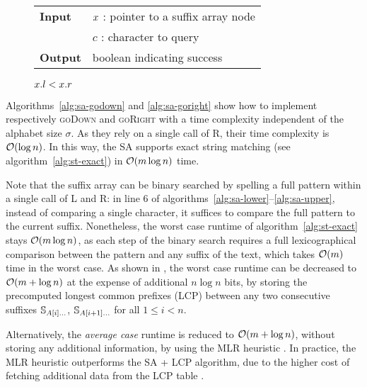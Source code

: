 \begin{figure*}[b!]
\begin{center}
\begin{minipage}[t]{.6\textwidth}
\begin{algorithm}[H]
\begin{tabular}{ll}
\textbf{Input}  & $x$ : pointer to a suffix array node\\
				& $c$ : character to query\\
\textbf{Output} & boolean indicating success\\
\end{tabular}
\begin{algorithmic}[1]
	\State \Return \False
\EndIf
{}
\State \Return $x.l < x.r$
\end{algorithmic}
\label{alg:sa-godownc}
\end{algorithm}
\end{minipage}
\end{center}
\end{figure*}

Algorithms~\ref{alg:sa-godown} and \ref{alg:sa-goright} show how to implement respectively \textsc{goDown} and \textsc{goRight} with a time complexity independent of the alphabet size $\sigma$.
As they rely on a single call of \textsc{R}, their time complexity is $\mathcal{O}(\log{n})$.
In this way, the SA supports exact string matching (see algorithm~\ref{alg:st-exact}) in $\mathcal{O}(m \log{n})$ time.

Note that the suffix array can be binary searched by spelling a full pattern within a single call of \textsc{L} and \textsc{R}: in line 6 of algorithms~\ref{alg:sa-lower}--\ref{alg:sa-upper}, instead of comparing a single character, it suffices to compare the full pattern to the current suffix.
Nonetheless, the worst case runtime of algorithm~\ref{alg:st-exact} stays $\mathcal{O}(m \log{n})$, as each step of the binary search requires a full lexicographical comparison between the pattern and any suffix of the text, which takes $\mathcal{O}(m)$ time in the worst case.
As shown in \citep{Manber1990}, the worst case runtime can be decreased to $\mathcal{O}(m + \log{n})$ at the expense of additional $n \log{n}$ bits, by storing the precomputed longest common prefixes (LCP) between any two consecutive suffixes $\mathbb {S}_{A[i] \dots}$, $\mathbb {S}_{A[i+1] \dots}$ for all $1 \leq i < n$.

Alternatively, the \emph{average case} runtime is reduced to $\mathcal{O}(m + \log{n})$, without storing any additional information, by using the MLR heuristic \citep{Manber1990}.
In practice, the MLR heuristic outperforms the SA + LCP algorithm, due to the higher cost of fetching additional data from the LCP table \citep{Weese2013}.


